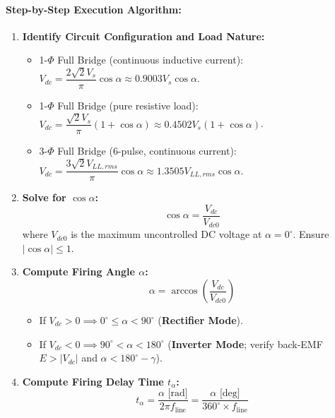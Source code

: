 \paragraph{Step-by-Step Execution Algorithm:}
\begin{enumerate}
  \item \textbf{Identify Circuit Configuration and Load Nature:}
  \begin{itemize}
    \item 1-$\Phi$ Full Bridge (continuous inductive current): $V_{dc} = \dfrac{2\sqrt{2} V_s}{\pi}\cos\alpha \approx 0.9003 V_s \cos\alpha$.
    \item 1-$\Phi$ Full Bridge (pure resistive load): $V_{dc} = \dfrac{\sqrt{2} V_s}{\pi}(1 + \cos\alpha) \approx 0.4502 V_s (1 + \cos\alpha)$.
    \item 3-$\Phi$ Full Bridge (6-pulse, continuous current): $V_{dc} = \dfrac{3\sqrt{2} V_{LL,rms}}{\pi}\cos\alpha \approx 1.3505 V_{LL,rms} \cos\alpha$.
  \end{itemize}
  \item \textbf{Solve for $\cos\alpha$:}
  \[
  \cos\alpha = \frac{V_{dc}}{V_{dc0}}
  \]
  where $V_{dc0}$ is the maximum uncontrolled DC voltage at $\alpha = 0^\circ$. Ensure $|\cos\alpha| \le 1$.
  \item \textbf{Compute Firing Angle $\alpha$:}
  \[
  \alpha = \arccos\left(\frac{V_{dc}}{V_{dc0}}\right)
  \]
  \begin{itemize}
    \item If $V_{dc} > 0 \implies 0^\circ \le \alpha < 90^\circ$ (\textbf{Rectifier Mode}).
    \item If $V_{dc} < 0 \implies 90^\circ < \alpha < 180^\circ$ (\textbf{Inverter Mode}; verify back-EMF $E > |V_{dc}|$ and $\alpha < 180^\circ - \gamma$).
  \end{itemize}
  \item \textbf{Compute Firing Delay Time $t_\alpha$:}
  \[
  t_\alpha = \frac{\alpha \text{ [rad]}}{2\pi f_{\mathrm{line}}} = \frac{\alpha \text{ [deg]}}{360^\circ \times f_{\mathrm{line}}}
  \]
\end{enumerate}

